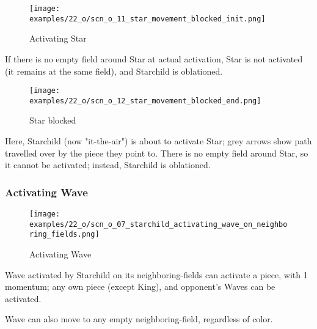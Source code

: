 \noindent
\begin{wrapfigure}[4]{l}{0.4\textwidth}
\centering
\texttt{[image: examples/22\_o/scn\_o\_11\_star\_movement\_blocked\_init.png]}
\caption{Activating Star}
\label{fig:scn_o_11_star_movement_blocked_init}
\end{wrapfigure}
If there is no empty field around Star at actual activation, Star is not activated
(it remains at the same field), and Starchild is oblationed.

\vspace*{3.1\baselineskip}
\noindent
\begin{wrapfigure}[7]{l}{0.4\textwidth}
\centering
\texttt{[image: examples/22\_o/scn\_o\_12\_star\_movement\_blocked\_end.png]}
\caption{Star blocked}
\label{fig:scn_o_12_star_movement_blocked_end}
\end{wrapfigure}
Here, Starchild (now "it-the-air") is about to activate Star; grey arrows show path
travelled over by the piece they point to. There is no empty field around Star, so it
cannot be activated; instead, Starchild is oblationed.

\vspace*{-0.1\baselineskip}
\subsubsection*{Activating Wave}

\noindent
\begin{wrapfigure}[8]{l}{0.4\textwidth}
\centering
\texttt{[image: examples/22\_o/scn\_o\_07\_starchild\_activating\_wave\_on\_neighboring\_fields.png]}
\caption{Activating Wave}
\label{fig:scn_o_07_starchild_activating_wave_on_neighboring_fields}
\end{wrapfigure}
Wave activated by Starchild on its neighboring-fields can activate a piece, with
1 momentum; any own piece (except King), and opponent's Waves can be activated.

Wave can also move to any empty neighboring-field, regardless of color.

\clearpage %

